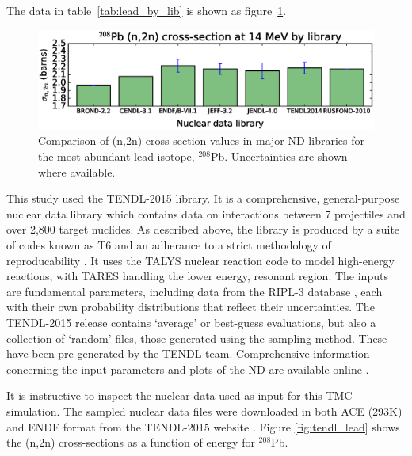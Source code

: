 The data in table~\ref{tab:lead_by_lib} is shown as figure~\ref{fig:lead_by_lib}.

\begin{figure}[H]
  \centering
  \includegraphics[width=\textwidth]{pb208_n2n_by_lib}
  \caption{Comparison of (n,2n) cross-section values in major ND libraries for the most abundant lead isotope, $^{208}$Pb. Uncertainties are shown where available.}
  \label{fig:lead_by_lib}
\end{figure}

This study used the TENDL-2015 library. It is a comprehensive, general-purpose nuclear data library which contains data on interactions between 7 projectiles and over 2,800 target nuclides. As described above, the library is produced by a suite of codes known as T6 and an adherance to a strict methodology of reproducability \cite{Rochman2016}. It uses the TALYS nuclear reaction code to model high-energy reactions, with TARES handling the lower energy, resonant region. The inputs are fundamental parameters, including data from the RIPL-3 database \cite{Capote2009}, each with their own probability distributions that reflect their uncertainties. The TENDL-2015 release contains `average' or best-guess evaluations, but also a collection of `random' files, those generated using the sampling method. These have been pre-generated by the TENDL team. Comprehensive information concerning the input parameters and plots of the ND are available online \cite{TENDL2015}.

It is instructive to inspect the nuclear data used as input for this TMC simulation. The sampled nuclear data files were downloaded in both ACE (293K) and ENDF format from the TENDL-2015 website \cite{TENDL2015}. Figure \ref{fig:tendl_lead} shows the (n,2n) cross-sections as a function of energy for $^{208}$Pb. 


